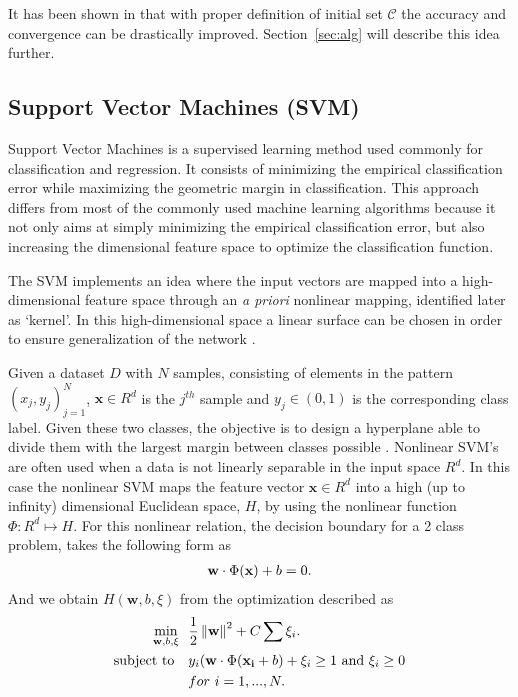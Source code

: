 \documentclass[letterpaper, 10 pt, conference]{ieeeconf}
\begin{document}
It has been shown in \cite{arthur2007k} that with proper definition of initial set $\mathcal{C}$ the accuracy and convergence can be drastically improved. Section~\ref{sec:alg} will describe this idea further.








\subsection{Support Vector Machines (SVM) } \label{sec:SVM}
Support Vector Machines is a supervised learning method used commonly for classification and regression. It consists of minimizing the empirical classification error while maximizing the geometric margin in classification. This approach differs from most of the commonly used machine learning algorithms because it not only aims at simply minimizing the empirical classification error, but also increasing the dimensional feature space to optimize the classification function\cite{yeo2009can}. 

The SVM implements an idea where the input vectors are mapped into a high-dimensional feature space through an \textit{a priori} nonlinear mapping, identified later as `kernel'. In this high-dimensional space a linear surface can be chosen in order to ensure generalization of the network \cite{cortes1995support}.

Given a dataset $D$ with $N$ samples, consisting of elements in the pattern ${(x_j,y_j)^N_{j=1}}$, $\textbf{x} \in R^d$ is the $j^{th}$ sample and $y_j \in (0,1)$ is the corresponding class label. Given these two classes, the objective is to design a hyperplane able to divide them with the largest margin between classes possible \cite{duda2012pattern}. Nonlinear SVM's are often used when a data is not linearly separable in the input space $R^d$. In this case the nonlinear SVM maps the feature vector $\textbf{x} \in R^d$ into a high (up to infinity) dimensional Euclidean space, $H$, by using the nonlinear function $\Phi : R^d \mapsto H$. For this nonlinear relation, the decision boundary for a 2 class problem, takes the following form as
\begin{align}\label{eq:hyperplane}
\centering
\textbf{w}\cdot \Phi(\textbf{x}) + b =0. 
\end{align}
And we obtain $H(\textbf{w},b,\xi)$ from the optimization described as
\begin{align}
\centering
\min_{\textbf{w},b,\xi}~~ &\frac{1}{2} \left \| \mathbf{w} \right \|^2 +C\sum \xi_i.\label{eq:optimization_svm}\\
\textup{subject to}~~~&y_i(\mathbf{w}\cdot\Phi(\mathbf{x_i}+b)+\xi_i \geq 1 ~\textup{and}~ \xi_i \geq 0 \notag\\
&for~i = 1,...,N.\notag
\end{align}
\end{document}
